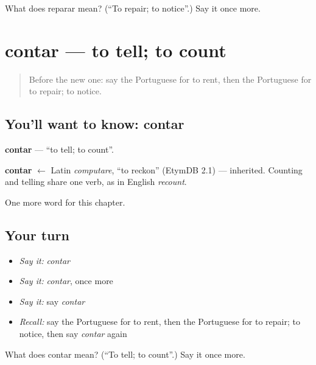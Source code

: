 \begin{tcolorbox}[breakable,colback=teal!4,colframe=teal!35!black,title={Before you move on}]
What does reparar mean? (\textquotedblleft{}To repair; to notice\textquotedblright{}.) Say it once more.
\end{tcolorbox}
\section[contar]{contar — to tell; to count}

\label{lesson:PT-C133-contar}



\begin{quote}
Before the new one: say the Portuguese for to rent, then the Portuguese for to repair; to notice.
\end{quote}

\subsection*{You'll want to know: contar}
\textbf{contar} — \textquotedblleft{}to tell; to count\textquotedblright{}.

\begin{cousinweb}
\textbf{contar} $\leftarrow$ Latin \emph{computare}, \textquotedblleft{}to reckon\textquotedblright{} (EtymDB 2.1) — inherited. Counting and telling share one verb, as in English \emph{recount}.
\end{cousinweb}

\begin{grammarlens}[title={What you've built}]
One more word for this chapter.
\end{grammarlens}

\subsection*{Your turn}
\begin{itemize}
\raggedright
  \item \emph{Say it:} \emph{contar}
  \item \emph{Say it:} \emph{contar}, once more
  \item \emph{Say it:} say \emph{contar}
  \item \emph{Recall:} say the Portuguese for to rent, then the Portuguese for to repair; to notice, then say \emph{contar} again
\end{itemize}

\begin{tcolorbox}[breakable,colback=teal!4,colframe=teal!35!black,title={Before you move on}]
What does contar mean? (\textquotedblleft{}To tell; to count\textquotedblright{}.) Say it once more.
\end{tcolorbox}
